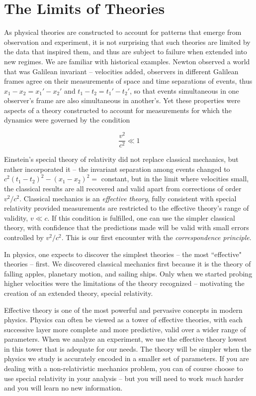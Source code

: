 \section{The Limits of Theories} 

As physical theories are constructed to account for patterns that emerge from
observation and experiment, it is not surprising that such theories are limited
by the data that inspired them, and thus are subject to failure when extended
into new regimes. We are familiar with historical examples. Newton observed
a world that was Galilean invariant -- velocities added, observers in different
Galilean frames agree on their measurements of space and time separations of
events, thus $x_1 - x_2 = x_1' - x_2'$ and $t_1-t_2 = t_1' - t_2'$, so that
events simultaneous in one observer's frame are also simultaneous in
another's. Yet these properties were aspects of a theory constructed to account
for measurements for which the dynamics were governed by the condition 

\[
\frac{v^2}{c^2} \ll 1
\] \vspace{3px}

Einstein's special theory of relativity did not replace classical mechanics,
but rather incorporated it -- the invariant separation among events changed to
$c^2 (t_1 - t_2)^2 - (x_1 - x_2)^2 = $ constant, but in the limit where
velocities small, the classical results are all recovered and valid apart from
corrections of order $v^2 / c^2$. Classical mechanics is an \textit{effective
theory}, fully consistent with special relativity provided measurements are
restricted to the effective theory's range of validity, $v \ll c$. If this
condition is fulfilled, one can use the simpler classical theory, with
confidence that the predictions made will be valid with small errors controlled
by $v^2/c^2$. This is our first encounter with the \textit{correspondence
principle}. 

In physics, one expects to discover the simplest theories -- the most
``effective" theories -- first. We discovered classical mechanics first because
it is the theory of falling apples, planetary motion, and sailing ships. Only
when we started probing higher velocities were the limitations of the theory
recognized -- motivating the creation of an extended theory, special
relativity. 

Effective theory is one of the most powerful and pervasive concepts in modern
physics. Physics can often be viewed as a tower of effective theories, with
each successive layer more complete and more predictive, valid over a wider
range of parameters. When we analyze an experiment, we use the effective theory
lowest in this tower that is adequate for our needs. The theory will be simpler
when the physics we study is accurately encoded in a smaller set of parameters.
If you are dealing with a non-relativistic mechanics problem, you can of course
choose to use special relativity in your analysis -- but you will need to work
\textit{much} harder and you will learn no new information. 

